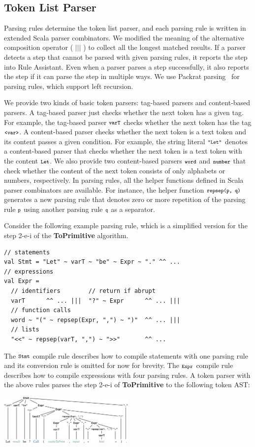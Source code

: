 \subsection{Token List Parser}
Parsing rules determine the token list parser, and each parsing rule
is written in extended Scala parser combinators.  We modified the
meaning of the alternative composition operator ( \( ||| \) ) to collect
all the longest matched results.  If a parser detects a step that
cannot be parsed with given parsing rules, it reports the step into
{\sf Rule Assistant}.  Even when a parser parses a step successfully,
it also reports the step if it can parse the step in multiple ways.
We use Packrat parsing~\cite{packrat} for parsing rules, which
support left recursion.

We provide two kinds of basic token parsers: tag-based parsers and
content-based parsers.  A tag-based parser just checks whether the next
token has a given tag.  For example, the tag-based parser \( \texttt{\footnotesize varT} \)
checks whether the next token has the tag \( \texttt{\footnotesize<var>} \).  A
content-based parser checks whether the next token is a text token and
its content passes a given condition.  For example, the string literal
\( \texttt{\footnotesize"Let"} \) denotes a content-based parser that checks whether
the next token is a text token with the content \( \texttt{\footnotesize Let} \).
We also provide two content-based parsers \( \texttt{\footnotesize word} \) and
\( \texttt{\footnotesize number} \) that check whether the content of the next token
consists of only alphabets or numbers, respectively.  In parsing
rules, all the helper functions defined in Scala parser combinators
are available.  For instance, the helper function \( \texttt{\footnotesize repsep(p, q)} \)
generates a new parsing rule that denotes zero or more repetition of the
parsing rule \( \texttt{\footnotesize p} \) using another parsing rule \( \texttt{\footnotesize q} \) as
a separator.

Consider the following example parsing rule, which is a simplified
version for the step 2-e-i of the \textbf{ToPrimitive} algorithm.
\begin{lstlisting}[style=myScalastyle]
// statements
val Stmt = "Let" ~ varT ~ "be" ~ Expr ~ "." ^^ ...
// expressions
val Expr =
  // identifiers        // return if abrupt
  varT      ^^ ... |||  "?" ~ Expr      ^^ ... |||
  // function calls
  word ~ "(" ~ repsep(Expr, ",") ~ ")"  ^^ ... |||
  // lists
  "<<" ~ repsep(varT, ",") ~ ">>"       ^^ ...
\end{lstlisting}
The \( \texttt{\footnotesize Stmt} \) compile rule describes how to compile statements
with one parsing rule and its conversion rule is omitted for now for
brevity.  The \( \texttt{\footnotesize Expr} \) compile rule describes how to compile
expressions with four parsing rules.  A token parser with the above
rules parses the step 2-e-i of \textbf{ToPrimitive} to the following
token AST:
\begin{center}
\includegraphics[width=0.5\textwidth]{img/token_ast.png}
\end{center}

